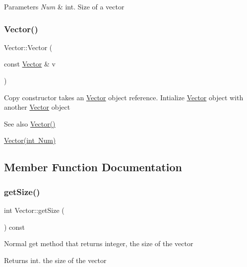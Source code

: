 \begin{DoxyParams}{Parameters}
{\em Num} & int. Size of a vector \\
\hline
\end{DoxyParams}
\mbox{\label{class_vector_a5f04e343b7306ad11f8a82c89b486764}} 
\subsubsection{\texorpdfstring{Vector()}{Vector()}\hspace{0.1cm}{\footnotesize\ttfamily [3/3]}}
{\footnotesize\ttfamily Vector\+::\+Vector (\begin{DoxyParamCaption}\item[{const \mbox{\hyperlink{class_vector}{Vector}} \&}]{v }\end{DoxyParamCaption})}

Copy constructor takes an \mbox{\hyperlink{class_vector}{Vector}} object reference. Intialize \mbox{\hyperlink{class_vector}{Vector}} object with another \mbox{\hyperlink{class_vector}{Vector}} object \begin{DoxySeeAlso}{See also}
\mbox{\hyperlink{class_vector_a6f80c73b5f18dcf3f8e36065bdc8b9e5}{Vector()}} 

\mbox{\hyperlink{class_vector_acbdf66550f2caa0a64e0b356fb63a277}{Vector(int Num)}} 
\end{DoxySeeAlso}


\subsection{Member Function Documentation}
\mbox{\label{class_vector_afbb7966ec4107c43ec15cccc47fcaef7}} 
\subsubsection{\texorpdfstring{get\+Size()}{getSize()}}
{\footnotesize\ttfamily int Vector\+::get\+Size (\begin{DoxyParamCaption}{ }\end{DoxyParamCaption}) const}

Normal get method that returns integer, the size of the vector \begin{DoxyReturn}{Returns}
int. the size of the vector 
\end{DoxyReturn}
\mbox{\label{class_vector_a6752a90058ddef427ca6aed12946a737}} 
